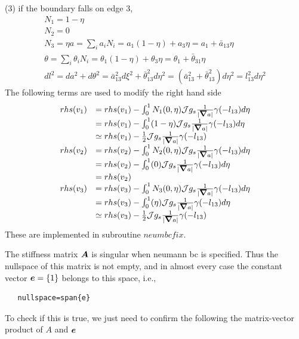 \documentclass{report}
\newcommand{\bm}[1]{\mbox{\boldmath $#1$}}
\newcommand{\ff}[2]{\frac{#1}{#2}}
\begin{document}
(3) if the boundary falls on edge $3$,
$$
\begin{array}{l}
N_1=1-\eta\\
N_2=0\\
N_3=\eta
a = \sum_i a_i N_i = a_1(1-\eta) + a_3 \eta = a_1 + \bar{a}_{13} \eta\\
\theta = \sum_i \theta_i N_i = \theta_1(1-\eta) + \theta_3 \eta = \theta_1 + \bar{\theta}_{31} \eta\\
dl^2 = da^2 + d\theta^2 
     = \bar{a}_{13}^2 d\xi^2 + \bar{\theta}_{13}^2 d\eta^2
     = (\bar{a}_{13}^2 + \bar{\theta}_{13}^2) d\eta^2
     = l_{13}^2 d\eta^2
\end{array}
$$
The following terms are used to modify the right hand side
$$
\begin{array}{ll}
rhs(v_1) & = rhs(v_1) - \int_0^1 N_1(0,\eta) {\cal J} g_s \ff{1}{|\bm{\nabla}a|} \gamma (-l_{13}) d\eta \\
         & = rhs(v_1) - \int_0^1 (1-\eta) {\cal J} g_s \ff{1}{|\bm{\nabla}a|} \gamma (-l_{13}) d\eta \\
         & \simeq rhs(v_1) - \ff{1}{2} {\cal J} g_s \ff{1}{|\bm{\nabla}a|} \gamma (-l_{13})
\\
rhs(v_2) & = rhs(v_2) - \int_0^1 N_2(0,\eta) {\cal J} g_s \ff{1}{|\bm{\nabla}a|} \gamma (-l_{13}) d\eta \\
         & = rhs(v_2) - \int_0^1 (0) {\cal J} g_s \ff{1}{|\bm{\nabla}a|} \gamma (-l_{13}) d\eta \\
         & = rhs(v_2)
\\
rhs(v_3) & = rhs(v_3) - \int_0^1 N_3(0,\eta) {\cal J} g_s \ff{1}{|\bm{\nabla}a|} \gamma (-l_{13}) d\eta \\
         & = rhs(v_3) - \int_0^1 (\eta) {\cal J} g_s \ff{1}{|\bm{\nabla}a|} \gamma (-l_{13}) d\eta \\
         & \simeq rhs(v_3) - \ff{1}{2} {\cal J} g_s \ff{1}{|\bm{\nabla}a|} \gamma (-l_{13})
\end{array}
$$
These are implemented in subroutine $neumbcfix$.


The stiffness matrix $\bm{A}$ is singular when neumann bc is specified.
Thus the nullspace of this matrix is not empty,
and in almost every case the constant vector $\bm{e}=\{1\}$ belongs to this space,
i.e.,

\begin{verbatim}
   nullspace=span{e}
\end{verbatim}

\noindent
To check if this is true, we just need to confirm the following the matrix-vector product of $A$ and $\bm{e}$
\end{document}
